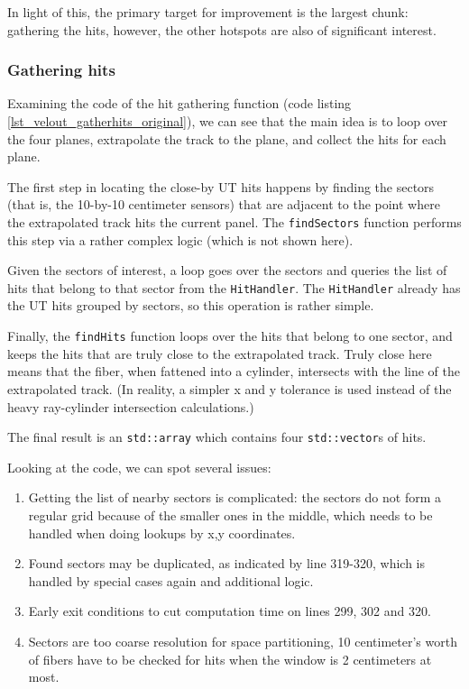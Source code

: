 \documentclass[12pt]{article}
\newcommand{\code}[1]{\texttt{#1}}
\begin{document}
In light of this, the primary target for improvement is the largest chunk: gathering the hits, however, the other hotspots are also of significant interest.


\subsubsection{Gathering hits}

Examining the code of the hit gathering function (code listing \ref{lst_velout_gatherhits_original}), we can see that the main idea is to loop over the four planes, extrapolate the track to the plane, and collect the hits for each plane.

The first step in locating the close-by UT hits happens by finding the sectors (that is, the 10-by-10 centimeter sensors) that are adjacent to the point where the extrapolated track hits the current panel. The \code{findSectors} function performs this step via a rather complex logic (which is not shown here).

Given the sectors of interest, a loop goes over the sectors and queries the list of hits that belong to that sector from the \code{HitHandler}. The \code{HitHandler} already has the UT hits grouped by sectors, so this operation is rather simple.

Finally, the \code{findHits} function loops over the hits that belong to one sector, and keeps the hits that are truly close to the extrapolated track. Truly close here means that the fiber, when fattened into a cylinder, intersects with the line of the extrapolated track. (In reality, a simpler x and y tolerance is used instead of the heavy ray-cylinder intersection calculations.)

The final result is an \code{std::array} which contains four \code{std::vector}s of hits.

\vspace{1pc}

Looking at the code, we can spot several issues:
\begin{enumerate}
	\item Getting the list of nearby sectors is complicated: the sectors do not form a regular grid because of the smaller ones in the middle, which needs to be handled when doing lookups by x,y coordinates.
	\item Found sectors may be duplicated, as indicated by line 319-320, which is handled by special cases again and additional logic.
	\item Early exit conditions to cut computation time on lines 299, 302 and 320.
	\item Sectors are too coarse resolution for space partitioning, 10 centimeter's worth of fibers have to be checked for hits when the window is 2 centimeters at most.
\end{enumerate}
\end{document}
